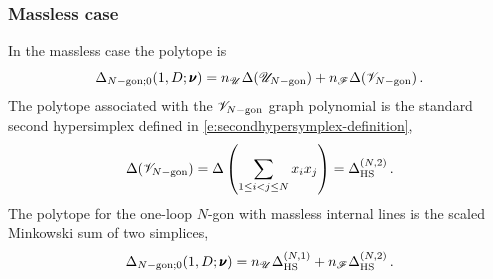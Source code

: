 \documentclass[12pt,a4paper]{article}
\theoremstyle{plain}
\theoremstyle{remark}
\newcommand{\nprops}{N}
\newcommand{\cU}{\mathscr {U}}
\newcommand{\cF}{\mathscr {F}}
\newcommand{\cV}{\mathscr {V}}
\newcommand{\undernotation}[1]{\pmb{#1}}
\newcommand{\Newton}{\Delta}
\newcommand{\simplexwithpars}[1]{\Newton_{\text{HS}}^{(#1)}}
\begin{document}
\subsubsection{Massless case}
In the massless case the polytope is
                      \begin{equation}
                               \Delta_{\nprops-\rm gon;0}(1,D;\undernotation{\nu})=
			n_{\cU}\Newton(\cU_{\nprops-\rm gon})+n_\cF \Newton(\cV_{\nprops-\rm gon})\,.
                      \end{equation}
The polytope associated with the $\cV_{\nprops-\rm gon}$ graph
polynomial is the standard second hypersimplex defined in \cref{e:secondhypersymplex-definition},
\begin{equation}
  \Newton(\cV_{\nprops-\rm
    gon})=\Newton\left(\sum_{1\leq i<j\leq
      \nprops}x_ix_j\right)=
      \simplexwithpars{\nprops,2} \, .
  \end{equation}
The polytope for the one-loop $\nprops$-gon with massless internal lines is the scaled Minkowski sum of two simplices,
  \begin{equation}\label{e:DeltaOneLoopMassless}
                               \Delta_{\nprops-\rm gon;0}(1,D;\undernotation{\nu})=
			n_{\cU}\simplexwithpars{\nprops,1}+n_\cF  \simplexwithpars{\nprops,2}\,.
                      \end{equation}
\end{document}
